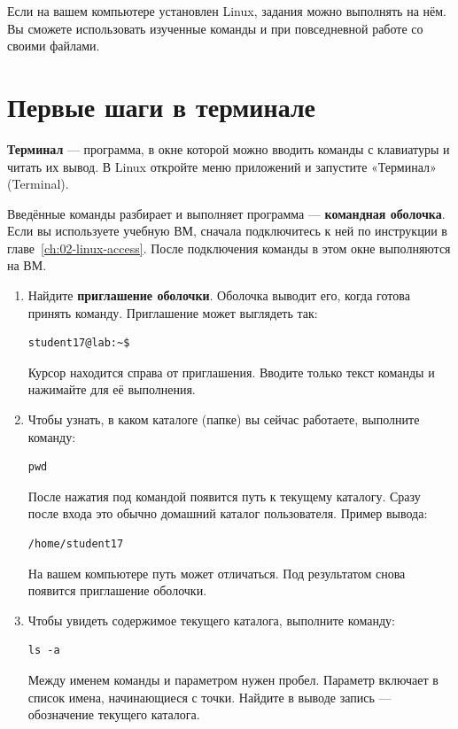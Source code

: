 Если на вашем компьютере установлен Linux, задания можно выполнять на нём.
Вы сможете использовать изученные команды и при повседневной работе
со своими файлами.

\section{Первые шаги в терминале}
\label{sec:first-steps-terminal}

\textbf{Терминал} --- программа, в окне которой можно вводить команды
с клавиатуры и читать их вывод. В Linux откройте меню приложений
и запустите «Терминал» (Terminal).

Введённые команды разбирает и выполняет программа ---
\textbf{командная оболочка}. Если вы используете учебную ВМ, сначала
подключитесь к ней по инструкции в главе~\ref{ch:02-linux-access}.
После подключения команды в этом окне выполняются на ВМ.

\begin{enumerate}
  \item Найдите \textbf{приглашение оболочки}. Оболочка выводит его, когда
    готова принять команду. Приглашение может выглядеть так:
\begin{verbatim}
student17@lab:~$
\end{verbatim}
    Курсор находится справа от приглашения. Вводите только текст команды
    и нажимайте  для её выполнения.
  \item Чтобы узнать, в каком каталоге (папке) вы сейчас работаете,
    выполните команду:
\begin{verbatim}
pwd
\end{verbatim}
    После нажатия  под командой появится путь к текущему
    каталогу. Сразу после входа это обычно домашний каталог пользователя.
    Пример вывода:
\begin{verbatim}
/home/student17
\end{verbatim}
    На вашем компьютере путь может отличаться. Под результатом снова
    появится приглашение оболочки.
  \item Чтобы увидеть содержимое текущего каталога, выполните команду:
\begin{verbatim}
ls -a
\end{verbatim}
    Между именем команды и параметром нужен пробел. Параметр 
    включает в список имена, начинающиеся с точки. Найдите в выводе
    запись  --- обозначение текущего каталога.
\end{enumerate}

